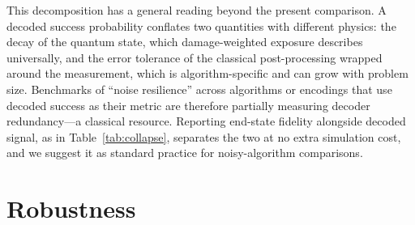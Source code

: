 \documentclass[aps,pra,reprint,superscriptaddress,nofootinbib,floatfix]{revtex4-2}
\begin{document}
This decomposition has a general reading beyond the present comparison.
A decoded success probability conflates two quantities with different
physics: the decay of the quantum state, which damage-weighted exposure
describes universally, and the error tolerance of the classical
post-processing wrapped around the measurement, which is
algorithm-specific and can grow with problem size. Benchmarks of
``noise resilience'' across algorithms or encodings that use decoded
success as their metric are therefore partially measuring decoder
redundancy---a classical resource. Reporting end-state fidelity
alongside decoded signal, as in Table~\ref{tab:collapse}, separates the
two at no extra simulation cost, and we suggest it as standard practice
for noisy-algorithm comparisons.

\section{Robustness}
\label{sec:robustness}
\end{document}

